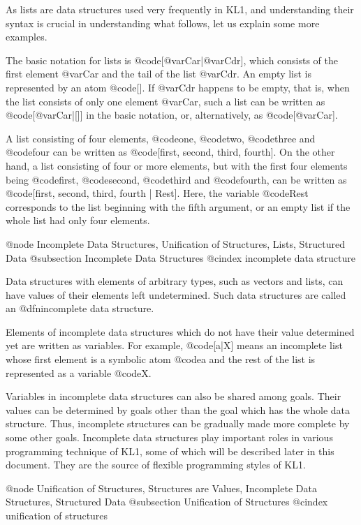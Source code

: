 {As lists are data structures used very frequently in KL1, and
understanding their syntax is crucial in understanding what follows, let
us explain some more examples.

The basic notation for lists is @code{[@var{Car}|@var{Cdr}]}, which
consists of the first element @var{Car} and the tail of the list
@var{Cdr}.  An empty list is represented by an atom @code{[]}.  If
@var{Cdr} happens to be empty, that is, when the list consists of only
one element @var{Car}, such a list can be written as
@code{[@var{Car}|[]]} in the basic notation, or, alternatively, as
@code{[@var{Car}]}.

A list consisting of four elements, @code{one}, @code{two}, @code{three}
and @code{four} can be written as @code{[first, second, third, fourth]}.
On the other hand, a list consisting of four or more elements, but with
the first four elements being @code{first}, @code{second}, @code{third}
and @code{fourth}, can be written as @code{[first, second, third, fourth
| Rest]}.  Here, the variable @code{Rest} corresponds to the list
beginning with the fifth argument, or an empty list if the whole list
had only four elements.

@node Incomplete Data Structures, Unification of Structures, Lists, Structured Data
@subsection Incomplete Data Structures
@cindex incomplete data structure

Data structures with elements of arbitrary types, such as vectors and
lists, can have values of their elements left undetermined.  Such data
structures are called an @dfn{incomplete data structure}.

Elements of incomplete data structures which do not have their value
determined yet are written as variables.  For example, @code{[a|X]}
means an incomplete list whose first element is a symbolic atom @code{a}
and the rest of the list is represented as a variable @code{X}.

Variables in incomplete data structures can also be shared among goals.
Their values can be determined by goals other than the goal which has
the whole data structure.  Thus, incomplete structures can be gradually
made more complete by some other goals.  Incomplete data structures play
important roles in various programming technique of KL1, some of which
will be described later in this document.  They are the source of
flexible programming styles of KL1.

@node Unification of Structures, Structures are Values, Incomplete Data Structures, Structured Data
@subsection Unification of Structures
@cindex unification of structures

}

